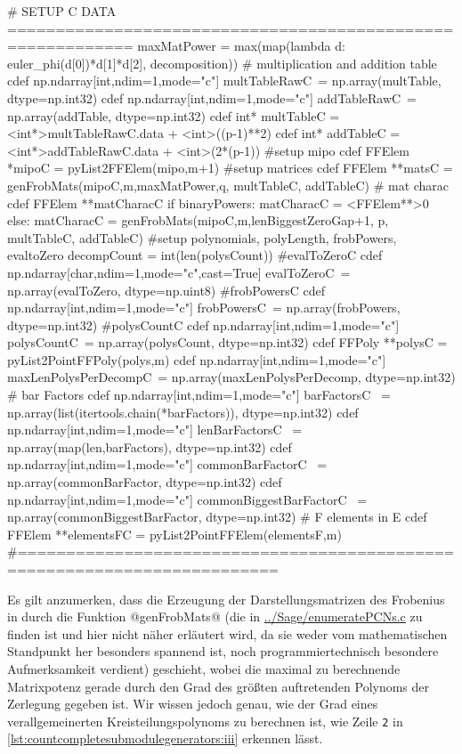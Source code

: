 \begin{sagecode}[caption={\texttt{countCompleteSubmoduleGenerators}
  Fortsetzung (III)}, label=lst:countcompletesubmodulegenerators:iii]
    # SETUP C DATA ===========================================================
    maxMatPower = max(map(lambda d: euler_phi(d[0])*d[1]*d[2], decomposition))
        # multiplication and addition table
    cdef np.ndarray[int,ndim=1,mode="c"] multTableRawC\
        = np.array(multTable, dtype=np.int32)
    cdef np.ndarray[int,ndim=1,mode="c"] addTableRawC\
        = np.array(addTable, dtype=np.int32)
    cdef int* multTableC = <int*>multTableRawC.data + <int>((p-1)**2)
    cdef int* addTableC = <int*>addTableRawC.data + <int>(2*(p-1))
        #setup mipo
    cdef FFElem *mipoC = pyList2FFElem(mipo,m+1)
       #setup matrices
    cdef FFElem **matsC  = genFrobMats(mipoC,m,maxMatPower,q,
            multTableC, addTableC)
        # mat charac
    cdef FFElem **matCharacC
    if binaryPowers:
        matCharacC = <FFElem**>0
    else:
        matCharacC = genFrobMats(mipoC,m,lenBiggestZeroGap+1,
                p, multTableC, addTableC)
    #setup polynomials, polyLength, frobPowers, evaltoZero
    decompCount = int(len(polysCount))
        #evalToZeroC
    cdef np.ndarray[char,ndim=1,mode="c",cast=True] evalToZeroC\
            = np.array(evalToZero, dtype=np.uint8)
        #frobPowersC
    cdef np.ndarray[int,ndim=1,mode="c"] frobPowersC\
            = np.array(frobPowers, dtype=np.int32)
        #polysCountC
    cdef np.ndarray[int,ndim=1,mode="c"] polysCountC\
            = np.array(polysCount, dtype=np.int32)
    cdef FFPoly **polysC = pyList2PointFFPoly(polys,m)
    cdef np.ndarray[int,ndim=1,mode="c"] maxLenPolysPerDecompC\
            = np.array(maxLenPolysPerDecomp, dtype=np.int32)
        # bar Factors
    cdef np.ndarray[int,ndim=1,mode="c"] barFactorsC \
        = np.array(list(itertools.chain(*barFactors)), dtype=np.int32)
    cdef np.ndarray[int,ndim=1,mode="c"] lenBarFactorsC \
        = np.array(map(len,barFactors), dtype=np.int32)
    cdef np.ndarray[int,ndim=1,mode="c"] commonBarFactorC \
        = np.array(commonBarFactor, dtype=np.int32)
    cdef np.ndarray[int,ndim=1,mode="c"] commonBiggestBarFactorC \
        = np.array(commonBiggestBarFactor, dtype=np.int32)
        # F elements in E
    cdef FFElem **elementsFC = pyList2PointFFElem(elementsF,m)
    #=========================================================================
\end{sagecode}

Es gilt anzumerken, dass die Erzeugung der Darstellungsmatrizen des Frobenius
in \Clang durch die Funktion @genFrobMats@ 
(die in \url{../Sage/enumeratePCNs.c} zu finden ist und hier nicht näher
erläutert wird, da sie weder vom mathematischen Standpunkt her besonders
spannend ist, noch programmiertechnisch besondere Aufmerksamkeit
verdient)
geschieht, wobei die maximal zu berechnende
Matrixpotenz gerade durch den Grad des größten auftretenden Polynoms der
Zerlegung gegeben ist. Wir wissen jedoch genau, wie der Grad eines
verallgemeinerten Kreisteilungspolynoms zu berechnen ist, wie Zeile
\texttt{2} in \autoref{lst:countcompletesubmodulegenerators:iii} erkennen lässt.

